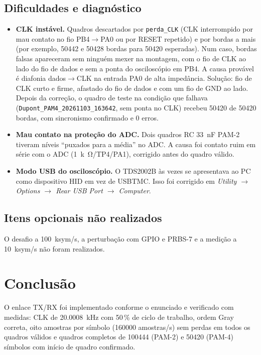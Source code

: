 \documentclass[12pt,a4paper]{article}
\begin{document}
\subsection{Dificuldades e diagnóstico}
\label{sec:dificuldades}

\begin{itemize}
    \item \textbf{CLK instável.} Quadros descartados por \texttt{perda\_CLK} (CLK interrompido por mau
    contato no fio PB4$\to$PA0 ou por RESET repetido) e por bordas a mais (por exemplo, \num{50442} e
    \num{50428} bordas para \num{50420} esperadas). Num caso, bordas falsas apareceram sem ninguém
    mexer na montagem, com o fio de CLK ao lado do fio de dados e sem a ponta do osciloscópio em PB4.
    A causa provável é diafonia dados$\to$CLK na entrada PA0 de alta impedância. Solução: fio de CLK
    curto e firme, afastado do fio de dados e com um fio de GND ao lado. Depois da correção, o quadro
    de teste na condição que falhava (\texttt{Dupont\_PAM4\_20261103\_163642}, sem ponta no CLK) recebeu
    \num{50420} de \num{50420} bordas, com sincronismo confirmado e 0 erros.
    \item \textbf{Mau contato na proteção do ADC.} Dois quadros RC \SI{33}{nF} PAM-2 tiveram níveis
    ``puxados para a média'' no ADC. A causa foi contato ruim em série com o ADC (\SI{1}{k\ohm}/TP4/PA1),
    corrigido antes do quadro válido.
    \item \textbf{Modo USB do osciloscópio.} O TDS2002B às vezes se apresentava ao PC como dispositivo
    HID em vez de USBTMC. Isso foi corrigido em \textit{Utility $\to$ Options $\to$ Rear USB Port
    $\to$ Computer}.
\end{itemize}

\subsection{Itens opcionais não realizados}

O desafio a \SI{100}{ksym/s}, a perturbação com GPIO e PRBS-7 e a medição a \SI{10}{ksym/s} não
foram realizados.

\section{Conclusão}

O enlace TX/RX foi implementado conforme o enunciado e verificado com medidas: CLK de
\SI{20,0008}{kHz} com 50\,\% de ciclo de trabalho, ordem Gray correta, oito amostras por símbolo
(\num{160000} amostras/s) sem perdas em todos os quadros válidos e quadros completos de
\num{100444} (PAM-2) e \num{50420} (PAM-4) símbolos com início de quadro confirmado.
\end{document}
